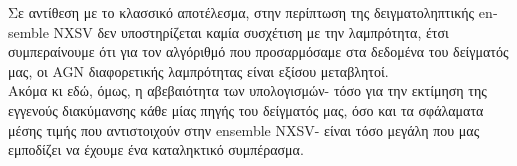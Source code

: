 Σε αντίθεση με το κλασσικό αποτέλεσμα, στην περίπτωση της δειγματοληπτικής \textlatin{ensemble NXSV} δεν υποστηρίζεται καμία συσχέτιση με την λαμπρότητα, έτσι συμπεραίνουμε ότι για τον αλγόριθμό που προσαρμόσαμε στα δεδομένα του δείγματός μας, οι \textlatin{AGN} διαφορετικής λαμπρότητας είναι εξίσου μεταβλητοί.\\
Ακόμα κι εδώ, όμως, η αβεβαιότητα των υπολογισμών- τόσο για την εκτίμηση της εγγενούς διακύμανσης κάθε μίας πηγής του δείγματός μας, όσο και τα σφάλαματα μέσης τιμής που αντιστοιχούν στην \textlatin{ensemble NXSV}- είναι τόσο μεγάλη που μας εμποδίζει να έχουμε ένα καταληκτικό συμπέρασμα. 